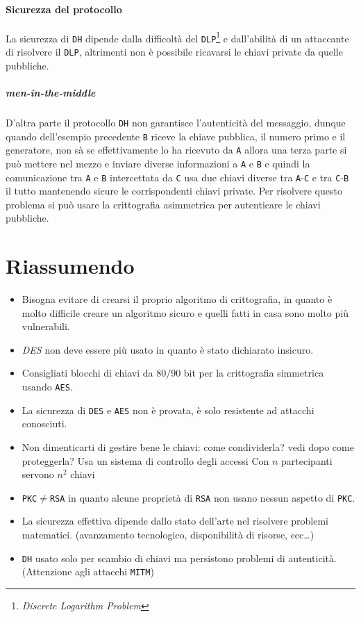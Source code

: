                 \paragraph{Sicurezza del protocollo} La sicurezza di \texttt{DH} dipende dalla difficoltà del \texttt{DLP}\footnote{\textit{Discrete Logarithm Problem}} e dall'abilità di un attaccante di risolvere il \texttt{DLP}, altrimenti non è possibile ricavarsi le chiavi private da quelle pubbliche.
                    \subparagraph{\textit{men-in-the-middle}} D'altra parte il protocollo \texttt{DH} non garantisce l'autenticità del messaggio, dunque quando dell'esempio precedente \texttt{B} riceve la chiave pubblica, il numero primo e il generatore, non sà se effettivamente lo ha ricevuto da \texttt{A} allora una terza parte si può mettere nel mezzo e inviare diverse informazioni a \texttt{A} e \texttt{B} e quindi la comunicazione tra \texttt{A} e \texttt{B} intercettata da \texttt{C} usa due chiavi diverse tra \texttt{A}-\texttt{C} e tra \texttt{C}-\texttt{B} il tutto mantenendo sicure le corrispondenti chiavi private. Per risolvere questo problema si può usare la crittografia asimmetrica per autenticare le chiavi pubbliche.
\section{Riassumendo}
\begin{itemize}
    \item Bisogna evitare di crearsi il proprio algoritmo di crittografia, in quanto è molto difficile creare un algoritmo sicuro e quelli fatti in casa sono molto più vulnerabili.
    \item \textit{DES} non deve essere più usato in quanto è stato dichiarato insicuro.
    \item Consigliati blocchi di chiavi da $ 80/90 $ bit per la crittografia simmetrica usando \texttt{AES}.
    \item La sicurezza di \texttt{DES} e \texttt{AES} non è provata, è solo resistente ad attacchi conosciuti.
    \item Non dimenticarti di gestire bene le chiavi:
        \subitem come condividerla? vedi dopo
        \subitem come proteggerla? Usa un sistema di controllo degli accessi
        \subitem Con $ n $ partecipanti servono $ n^2 $ chiavi
    \item \texttt{PKC}$\neq$\texttt{RSA} in quanto alcune proprietà di \texttt{RSA} non usano nessun aspetto di \texttt{PKC}.
    \item La sicurezza effettiva dipende dallo stato dell'arte nel risolvere problemi matematici. (avanzamento tecnologico, disponibilità di risorse, ecc\dots)
    \item \texttt{DH} usato solo per scambio di chiavi ma persistono problemi di autenticità. (Attenzione agli attacchi \texttt{MITM})
\end{itemize}
